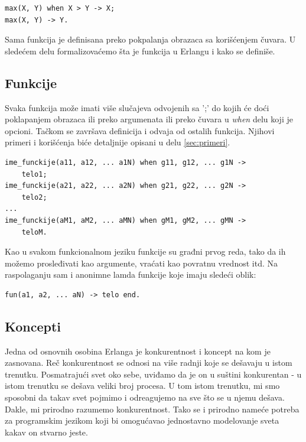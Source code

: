\documentclass[a4paper]{article}
\begin{document}
{\begin{verbatim}
max(X, Y) when X > Y -> X;
max(X, Y) -> Y.
\end{verbatim}

Sama funkcija je definisana preko pokpalanja obrazaca sa korišćenjem čuvara. U sledećem delu formalizovaćemo šta je funkcija u Erlangu i kako se definiše.



\subsection{Funkcije}

Svaka funkcija može imati više slučajeva odvojenih sa ';' 
do kojih će doći poklapanjem obrazaca ili preko argumenata ili preko čuvara u {\em when} delu koji je opcioni. 
Tačkom se završava definicija i odvaja od ostalih funkcija. 
Njihovi primeri i korišćenja biće detaljnije opisani u delu \ref{sec:primeri}.

\begin{verbatim}
ime_funckije(a11, a12, ... a1N) when g11, g12, ... g1N -> 
	telo1;
ime_funckije(a21, a22, ... a2N) when g21, g22, ... g2N -> 
	telo2;
...
ime_funckije(aM1, aM2, ... aMN) when gM1, gM2, ... gMN -> 
	teloM.
\end{verbatim}

Kao u svakom funkcionalnom jeziku funkcije su građni prvog reda, 
tako da ih možemo prosleđivati kao argumente, vraćati kao povratnu vrednost itd. Na raspolaganju sam i anonimne lamda funkcije koje imaju sledeći oblik:

\begin{verbatim}
fun(a1, a2, ... aN) -> telo end.
\end{verbatim}




\subsection{Koncepti}
\label{subsec:koncepti}

Jedna od osnovnih osobina Erlanga je konkurentnost i koncept na kom je zasnovana.
Reč konkurentnost se odnosi na više radnji koje se dešavaju u istom trenutku. Posmatrajući svet oko
sebe, uviđamo da je on u suštini konkurentan - u istom trenutku se dešava veliki broj procesa. \cite{phdthesis}
U tom istom trenutku, mi smo sposobni da takav svet pojmimo i odreagujemo na sve što se u njemu dešava. Dakle, mi prirodno razumemo konkurentnost.
Tako se i prirodno nameće potreba za programskim jezikom koji bi omogućavao jednostavno modelovanje sveta kakav on stvarno jeste. \\

}
\end{document}
